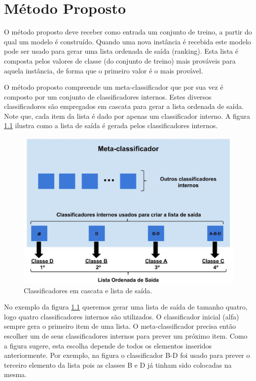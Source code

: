 \documentclass[dissertacao,brazil]{ThesisPUC}
\begin{document}
\chapter{Método Proposto}

O método proposto deve receber como entrada um conjunto de treino, a partir do qual um modelo é construído. Quando uma nova instância é recebida este modelo pode ser usado para gerar uma lista ordenada de saída (ranking). Esta lista é composta pelos valores de classe (do conjunto de treino) mais prováveis para aquela instância, de forma que o primeiro valor é o mais provável. 

O método proposto compreende um meta-classificador que por sua vez é composto por um conjunto de classificadores internos. Estes diversos classificadores são empregados em cascata para gerar a lista ordenada de saída. Note que, cada item da lista é dado por apenas um classificador interno. A figura \ref{fig:metodoproposto01} ilustra como a lista de saída é gerada pelos classificadores internos.

\begin{figure}[h!]
  \includegraphics[width=\linewidth]{images/metodoproposto01.eps}
  \caption{Classificadores em cascata e lista de saída.}
  \label{fig:metodoproposto01}
\end{figure}

No exemplo da figura \ref{fig:metodoproposto01} queremos gerar uma lista de saída de tamanho quatro, logo quatro classificadores internos são utilizados. O classificador inicial (alfa) sempre gera o primeiro item de uma lista. O meta-classificador precisa então escolher um de seus classificadores internos para prever um próximo item. Como a figura sugere, esta escolha depende de todos os elementos inseridos anteriormente. Por exemplo, na figura o classificador B-D foi usado para prever o terceiro elemento da lista pois as classes B e D já tinham sido colocadas na mesma.
\end{document}
